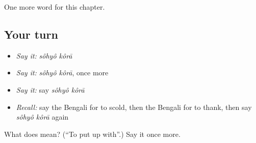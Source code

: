 \begin{grammarlens}[title={What you've built}]
One more word for this chapter.
\end{grammarlens}

\subsection*{Your turn}
\begin{itemize}
\raggedright
  \item \emph{Say it:} \emph{sôhyô kôrā}
  \item \emph{Say it:} \emph{sôhyô kôrā}, once more
  \item \emph{Say it:} say \emph{sôhyô kôrā}
  \item \emph{Recall:} say the Bengali for to scold, then the Bengali for to thank, then say \emph{sôhyô kôrā} again
\end{itemize}

\begin{tcolorbox}[breakable,colback=teal!4,colframe=teal!35!black,title={Before you move on}]
What does   mean? (\textquotedblleft{}To put up with\textquotedblright{}.) Say it once more.
\end{tcolorbox}
